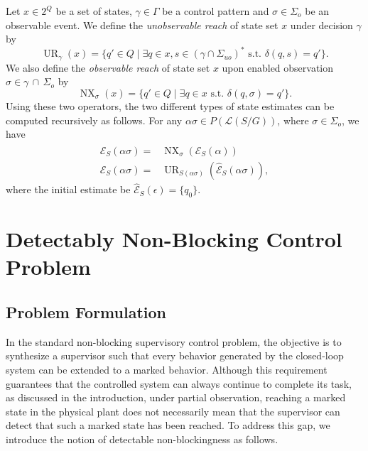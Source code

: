 \documentclass[twocolumn]{autart}
\def \L{\mathcal{L}}
\def \UR{\operatorname{UR}}
\def \NX{\operatorname{NX}}
\begin{document}
Let $x\in 2^Q$ be a set of states, $\gamma \in \Gamma$ be a control pattern and $\sigma\in \Sigma_o$ be an observable event. 
We define the \emph{unobservable reach} of state set $x$ under decision $\gamma$ by 
\begin{equation}\label{eq:ur}
    \UR_\gamma(x)=\{ q'\in Q\mid \exists q\!\in\! x,s\!\in\! (\gamma\cap\Sigma_{uo})^*\text{ s.t. }\delta(q,s)\!=\!q'  \}.
\end{equation}
We also define the \emph{observable reach} of state set $x$ upon enabled observation $\sigma \in \gamma \, \cap \, \Sigma_o$ by 
\begin{equation}\label{eq:nx}
    \NX_\sigma(x)=\{ q'\in Q\mid \exists q\!\in\! x \text{ s.t. }\delta(q,\sigma)\!=\!q'  \}.
\end{equation} 
Using these two operators, the two different types of state estimates can be computed recursively as follows. 
For any $\alpha \sigma \in P(\L(S/G))$, where $\sigma\in \Sigma_o$, we have
\begin{align}
\hat{\mathcal{E}}_S(\alpha\sigma)= & \NX_{\sigma}( {\mathcal{E}}_S(\alpha) )\\
    {\mathcal{E}}_S(\alpha\sigma)= & \UR_{S(\alpha\sigma)}( \hat{\mathcal{E}}_S(\alpha\sigma) ), 
\end{align}
where the initial estimate be $\hat{\mathcal{E}}_S(\epsilon)=\{q_0\}$. 
%

\newpage

\section{Detectably Non-Blocking Control Problem}
\label{sec:prob}

\subsection{Problem Formulation}

In the standard non-blocking supervisory control problem, the objective is to synthesize a supervisor such that every behavior generated by the closed-loop system can be extended to a marked behavior. 
Although this requirement guarantees that the controlled system can always continue to complete its task, as discussed in the introduction, under partial observation, reaching a marked state in the physical plant does not necessarily mean that the supervisor can detect that such a marked state has been reached.
To address this gap, we introduce the notion of detectable non-blockingness as follows.
\medskip 
\end{document}
